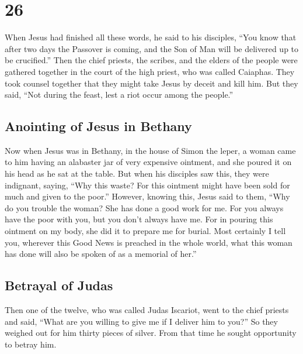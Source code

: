 \hypertarget{section-25}{%
\section{26}\label{section-25}}

 When Jesus had finished all these words, he said to his
disciples,  ``You know that after two days the Passover is
coming, and the Son of Man will be delivered up to be crucified.''
 Then the chief priests, the scribes, and the elders of
the people were gathered together in the court of the high priest, who
was called Caiaphas.  They took counsel together that they
might take Jesus by deceit and kill him.  But they said,
``Not during the feast, lest a riot occur among the people.''

\hypertarget{anointing-of-jesus-in-bethany}{%
\subsection{Anointing of Jesus in
Bethany}\label{anointing-of-jesus-in-bethany}}

 Now when Jesus was in Bethany, in the house of Simon the
leper,  a woman came to him having an alabaster jar of
very expensive ointment, and she poured it on his head as he sat at the
table.  But when his disciples saw this, they were
indignant, saying, ``Why this waste?  For this ointment
might have been sold for much and given to the poor.'' 
However, knowing this, Jesus said to them, ``Why do you trouble the
woman? She has done a good work for me.  For you always
have the poor with you, but you don't always have me. 
For in pouring this ointment on my body, she did it to prepare me for
burial.  Most certainly I tell you, wherever this Good
News is preached in the whole world, what this woman has done will also
be spoken of as a memorial of her.''

\hypertarget{betrayal-of-judas}{%
\subsection{Betrayal of Judas}\label{betrayal-of-judas}}

 Then one of the twelve, who was called Judas Iscariot,
went to the chief priests  and said, ``What are you
willing to give me if I deliver him to you?'' So they weighed out for
him thirty pieces of silver.  From that time he sought
opportunity to betray him.

